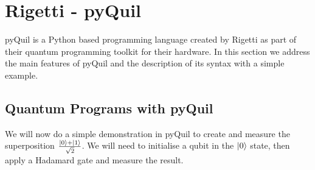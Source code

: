 \section{Rigetti - pyQuil}

pyQuil is a Python based programming language created by Rigetti \cite{pyQuilDoc} as part of their quantum programming toolkit for their hardware. In this section we address the main features of pyQuil and the description of its syntax with a simple example. 

\subsection{Quantum Programs with pyQuil} 
\label{Quantum Programs with pyQuil}


We will now do a simple demonstration in pyQuil to create and measure the superposition $\frac{\left\vert{0}\right\rangle+\left\vert{1}\right\rangle}{\sqrt{2}}$. We will need to initialise a qubit in the $\left\vert{0}\right\rangle$ state, then apply a Hadamard gate and measure the result.\\

